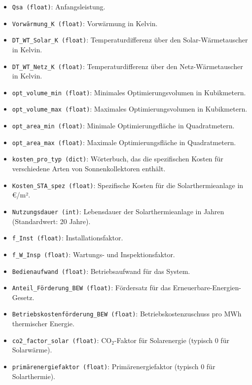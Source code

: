 \begin{itemize}
    \item \texttt{Qsa (float)}: Anfangsleistung.
    \item \texttt{Vorwärmung\_K (float)}: Vorwärmung in Kelvin.
    \item \texttt{DT\_WT\_Solar\_K (float)}: Temperaturdifferenz über den Solar-Wärmetauscher in Kelvin.
    \item \texttt{DT\_WT\_Netz\_K (float)}: Temperaturdifferenz über den Netz-Wärmetauscher in Kelvin.
    \item \texttt{opt\_volume\_min (float)}: Minimales Optimierungsvolumen in Kubikmetern.
    \item \texttt{opt\_volume\_max (float)}: Maximales Optimierungsvolumen in Kubikmetern.
    \item \texttt{opt\_area\_min (float)}: Minimale Optimierungsfläche in Quadratmetern.
    \item \texttt{opt\_area\_max (float)}: Maximale Optimierungsfläche in Quadratmetern.
    \item \texttt{kosten\_pro\_typ (dict)}: Wörterbuch, das die spezifischen Kosten für verschiedene Arten von Sonnenkollektoren enthält.
    \item \texttt{Kosten\_STA\_spez (float)}: Spezifische Kosten für die Solarthermieanlage in €/m².
    \item \texttt{Nutzungsdauer (int)}: Lebensdauer der Solarthermieanlage in Jahren (Standardwert: 20 Jahre).
    \item \texttt{f\_Inst (float)}: Installationsfaktor.
    \item \texttt{f\_W\_Insp (float)}: Wartungs- und Inspektionsfaktor.
    \item \texttt{Bedienaufwand (float)}: Betriebsaufwand für das System.
    \item \texttt{Anteil\_Förderung\_BEW (float)}: Fördersatz für das Erneuerbare-Energien-Gesetz.
    \item \texttt{Betriebskostenförderung\_BEW (float)}: Betriebskostenzuschuss pro MWh thermischer Energie.
    \item \texttt{co2\_factor\_solar (float)}: CO$_2$-Faktor für Solarenergie (typisch 0 für Solarwärme).
    \item \texttt{primärenergiefaktor (float)}: Primärenergiefaktor (typisch 0 für Solarthermie).
\end{itemize}


